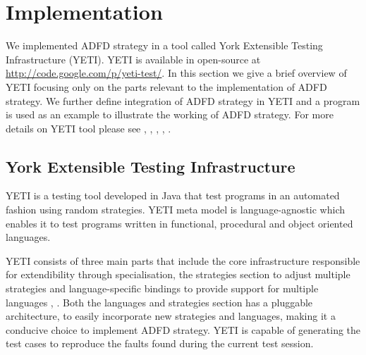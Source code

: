\documentclass[runningheads,a4paper]{llncs}
\begin{document}



\section{Implementation}\label{sec:implementation}
 We implemented ADFD strategy in a tool called York Extensible Testing Infrastructure (YETI). YETI is available in open-source at \url{http://code.google.com/p/yeti-test/}. In this section we give a brief overview of YETI focusing only on the parts relevant to the implementation of ADFD strategy. We further define integration of ADFD strategy in YETI and a program is used as an example to illustrate the working of ADFD strategy. For more details on YETI tool please see \cite{Oriol2010},  \cite{Oriol2010a},  \cite{Oriol2010b},  \cite{Oriol2011},  \cite{Oriol2012}.

 \subsection{York Extensible Testing Infrastructure}
YETI is a testing tool developed in Java that test programs in an automated fashion using random strategies. YETI meta model is language-agnostic which enables it to test programs written in functional, procedural and object oriented languages.

YETI consists of three main parts that include the core infrastructure responsible for extendibility through specialisation, the strategies section to adjust multiple strategies and language-specific bindings to provide support for multiple languages \cite{Oriol2010},  \cite{Oriol2010b}. Both the languages and strategies section has a pluggable architecture, to easily incorporate new strategies and languages, making it a conducive choice to implement ADFD strategy. YETI is capable of generating the test cases to reproduce the faults found during the current test session.
 
\end{document}
